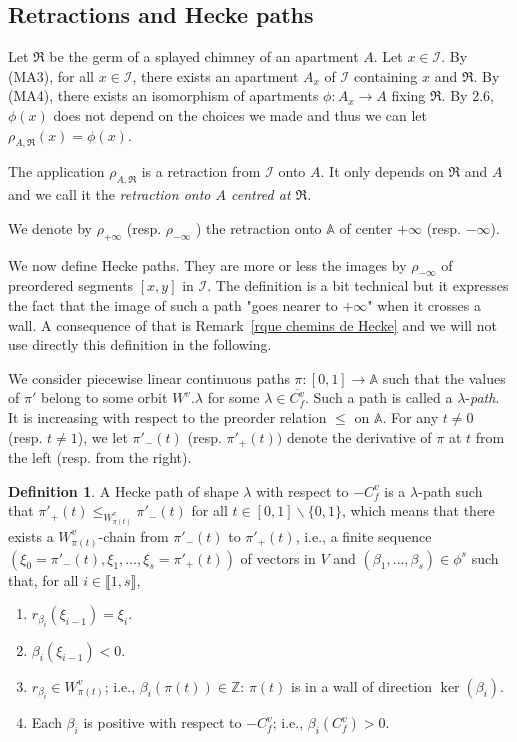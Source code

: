 \documentclass[12pt]{article}
\theoremstyle{plain}
\theoremstyle{definition}
\newtheorem{defn}[thm]{Definition}
\newcommand{\A}{\mathbb{A}}
\newcommand{\Z}{\mathbb{Z}}
\newcommand{\I}{\mathcal{I}}
\begin{document}
\subsection{Retractions and Hecke paths}


Let  $\mathfrak{R}$ be the germ of a splayed chimney of an apartment $A$. Let $x\in \I$. By (MA3), for all $x\in \I$, there exists an apartment $A_x$ of $\I$ containing $x$ and $\mathfrak{R}$. By (MA4), there exists an isomorphism of apartments $\phi:A_x\rightarrow A$ fixing $\mathfrak{R}$. By \cite{rousseau2011masures} 2.6, $\phi(x)$ does not depend on the choices we made and thus we can let $\rho_{A,\mathfrak{R}}(x)=\phi(x)$.

The application $\rho_{A,\mathfrak{R}}$ is a retraction from $\I$ onto $A$. It only depends on $\mathfrak{R}$ and $A$ and we call it the \textit{retraction onto $A$ centred at $\mathfrak{R}$}. 

We denote by $\rho_{+\infty}$ (resp. $\rho_{-\infty}$ ) the retraction onto $\A$ of center $+\infty$ (resp. $-\infty$).

We now define Hecke paths. They are more or less the images by $\rho_{-\infty}$ of preordered segments $[x,y]$ in $\I$. The definition is a bit technical but it expresses the fact that the image of such a path "goes nearer to $+\infty$" when it crosses a wall. A consequence of that is Remark~\ref{rque chemins de Hecke} and we will not use directly this definition in the following.

 We consider piecewise linear continuous paths $\pi:[0,1]\rightarrow \A$ such that the values  of $\pi'$ belong to some orbit $W^v.\lambda$ for some $\lambda\in \overline{C_f^v}$. Such a path is called a $\lambda$-\textit{path}. It is increasing with respect to the preorder relation $\leq$ on $\A$. For any $t\neq 0$ (resp. $t\neq 1$), we let $\pi'_-(t)$ (resp. $\pi'_+(t))$ denote the derivative of $\pi$ at $t$ from the left (resp. from the right).

\begin{defn}
A Hecke path of shape $\lambda$ with respect to $-C_f^v$ is a $\lambda$-path such that
 $\pi'_+(t)\leq_{W^v_{\pi (t)}} \pi'_-(t)$ for all $t\in [0,1]\backslash \{0,1\}$, which 
 means that there exists a $W_{\pi(t)}^v$-chain from $\pi'_-(t)$ to $\pi'_{+}(t)$, i.e., a 
 finite sequence $(\xi_0=\pi'_-(t),\xi_1,\ldots, \xi_s=\pi'_+(t))$ of vectors in $V$ and
  $(\beta_1,\ldots,\beta_s)\in \phi^s$ such that, for all $i\in \llbracket 1,s\rrbracket$,
\begin{enumerate}
\item $r_{\beta_i}(\xi_{i-1})=\xi_i.$

\item $\beta_i(\xi_{i-1})<0.$

\item $r_{\beta_i}\in W^v_{\pi(t)}$; i.e., $\beta_i(\pi(t))\in \Z$: $\pi(t)$ is in a wall of direction $\ker(\beta_i)$.

\item Each $\beta_i$ is positive with respect to $-C_f^v$; i.e., $\beta_i(C_f^v)>0$.
\end{enumerate}
\end{defn}
\end{document}

